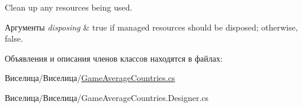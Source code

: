 Clean up any resources being used. 


\begin{DoxyParams}{Аргументы}
{\em disposing} & true if managed resources should be disposed; otherwise, false.\\
\hline
\end{DoxyParams}


Объявления и описания членов классов находятся в файлах\+:\begin{DoxyCompactItemize}
\item 
Виселица/Виселица/\hyperlink{_game_average_countries_8cs}{Game\+Average\+Countries.\+cs}\item 
Виселица/Виселица/Game\+Average\+Countries.\+Designer.\+cs\end{DoxyCompactItemize}
